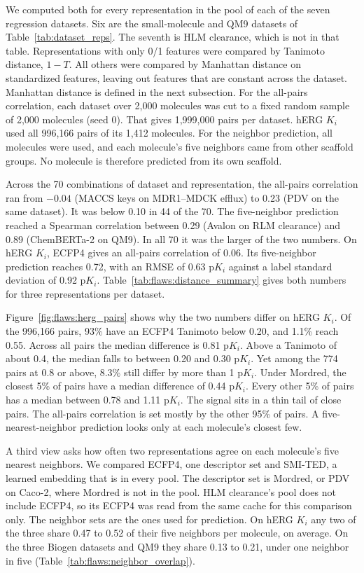 We computed both for every representation in the pool of each of the seven regression datasets. Six are the small-molecule and QM9 datasets of Table~\ref{tab:dataset_reps}. The seventh is HLM clearance, which is not in that table. Representations with only 0/1 features were compared by Tanimoto distance, $1-T$. All others were compared by Manhattan distance on standardized features, leaving out features that are constant across the dataset. Manhattan distance is defined in the next subsection. For the all-pairs correlation, each dataset over 2,000 molecules was cut to a fixed random sample of 2,000 molecules (seed 0). That gives 1,999,000 pairs per dataset. hERG $K_i$ used all 996,166 pairs of its 1,412 molecules. For the neighbor prediction, all molecules were used, and each molecule's five neighbors came from other scaffold groups. No molecule is therefore predicted from its own scaffold.

Across the 70 combinations of dataset and representation, the all-pairs correlation ran from $-0.04$ (MACCS keys on MDR1--MDCK efflux) to 0.23 (PDV on the same dataset). It was below 0.10 in 44 of the 70. The five-neighbor prediction reached a Spearman correlation between 0.29 (Avalon on RLM clearance) and 0.89 (ChemBERTa-2 on QM9). In all 70 it was the larger of the two numbers. On hERG $K_i$, ECFP4 gives an all-pairs correlation of 0.06. Its five-neighbor prediction reaches 0.72, with an RMSE of 0.63 p$K_i$ against a label standard deviation of 0.92 p$K_i$. Table~\ref{tab:flaws:distance_summary} gives both numbers for three representations per dataset.

Figure~\ref{fig:flaws:herg_pairs} shows why the two numbers differ on hERG $K_i$. Of the 996,166 pairs, 93\% have an ECFP4 Tanimoto below 0.20, and 1.1\% reach 0.55. Across all pairs the median difference is 0.81 p$K_i$. Above a Tanimoto of about 0.4, the median falls to between 0.20 and 0.30 p$K_i$. Yet among the 774 pairs at 0.8 or above, 8.3\% still differ by more than 1 p$K_i$. Under Mordred, the closest 5\% of pairs have a median difference of 0.44 p$K_i$. Every other 5\% of pairs has a median between 0.78 and 1.11 p$K_i$. The signal sits in a thin tail of close pairs. The all-pairs correlation is set mostly by the other 95\% of pairs. A five-nearest-neighbor prediction looks only at each molecule's closest few.

A third view asks how often two representations agree on each molecule's five nearest neighbors. We compared ECFP4, one descriptor set and SMI-TED, a learned embedding that is in every pool. The descriptor set is Mordred, or PDV on Caco-2, where Mordred is not in the pool. HLM clearance's pool does not include ECFP4, so its ECFP4 was read from the same cache for this comparison only. The neighbor sets are the ones used for prediction. On hERG $K_i$ any two of the three share 0.47 to 0.52 of their five neighbors per molecule, on average. On the three Biogen datasets and QM9 they share 0.13 to 0.21, under one neighbor in five (Table~\ref{tab:flaws:neighbor_overlap}).


